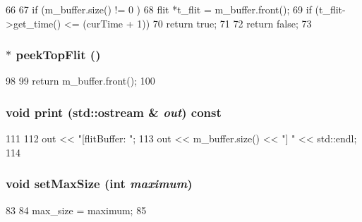 \begin{DoxyCode}
66 {
67     if (m_buffer.size() != 0 ) {
68         flit *t_flit = m_buffer.front();
69         if (t_flit->get_time() <= (curTime + 1))
70             return true;
71     }
72     return false;
73 }
\end{DoxyCode}
\hypertarget{classflitBuffer_a9acec5a59084e74a736447b76d614e3f}{
\subsubsection[{peekTopFlit}]{ $\ast$ peekTopFlit ()}}
\label{classflitBuffer_a9acec5a59084e74a736447b76d614e3f}



\begin{DoxyCode}
98 {
99     return m_buffer.front();
100 }
\end{DoxyCode}
\hypertarget{classflitBuffer_ac55fe386a101fbae38c716067c9966a0}{
\subsubsection[{print}]{\setlength{\rightskip}{0pt plus 5cm}void print (std::ostream \& {\em out}) const}}
\label{classflitBuffer_ac55fe386a101fbae38c716067c9966a0}



\begin{DoxyCode}
111 {
112     out << "[flitBuffer: ";
113     out << m_buffer.size() << "] " << std::endl;
114 }
\end{DoxyCode}
\hypertarget{classflitBuffer_ac58f3102de0ff8d654c9dbdf86c82b2a}{
\subsubsection[{setMaxSize}]{\setlength{\rightskip}{0pt plus 5cm}void setMaxSize (int {\em maximum})}}
\label{classflitBuffer_ac58f3102de0ff8d654c9dbdf86c82b2a}



\begin{DoxyCode}
83 {
84     max_size = maximum;
85 }
\end{DoxyCode}


